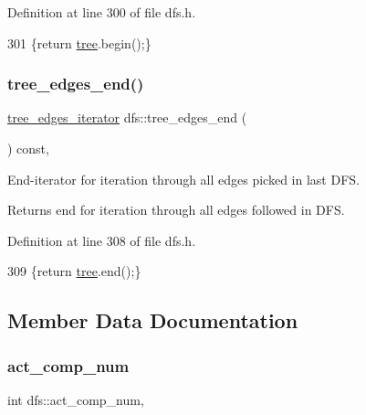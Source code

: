 Definition at line 300 of file dfs.\+h.


\begin{DoxyCode}
301     \{\textcolor{keywordflow}{return} \mbox{\hyperlink{classdfs_aed496b618a937723bfec0b463e17e8d5}{tree}}.begin();\}
\end{DoxyCode}
\mbox{\label{classdfs_ad1b9f759569cb52ba7ee415862c79831}} 
\subsubsection{\texorpdfstring{tree\+\_\+edges\+\_\+end()}{tree\_edges\_end()}}
{\footnotesize\ttfamily \mbox{\hyperlink{classdfs_accde8d5403404f6d22fe4756d4ffedd5}{tree\+\_\+edges\+\_\+iterator}} dfs\+::tree\+\_\+edges\+\_\+end (\begin{DoxyParamCaption}{ }\end{DoxyParamCaption}) const\hspace{0.3cm}{\ttfamily [inline]}, {\ttfamily [inherited]}}



End-\/iterator for iteration through all edges picked in last D\+FS. 

\begin{DoxyReturn}{Returns}
end for iteration through all edges followed in D\+FS. 
\end{DoxyReturn}


Definition at line 308 of file dfs.\+h.


\begin{DoxyCode}
309     \{\textcolor{keywordflow}{return} \mbox{\hyperlink{classdfs_aed496b618a937723bfec0b463e17e8d5}{tree}}.end();\}
\end{DoxyCode}


\subsection{Member Data Documentation}
\mbox{\label{classdfs_ab0251ac30adfd569e214a64db7f3a905}} 
\subsubsection{\texorpdfstring{act\+\_\+comp\+\_\+num}{act\_comp\_num}}
{\footnotesize\ttfamily int dfs\+::act\+\_\+comp\+\_\+num\hspace{0.3cm}{\ttfamily [protected]}, {\ttfamily [inherited]}}



